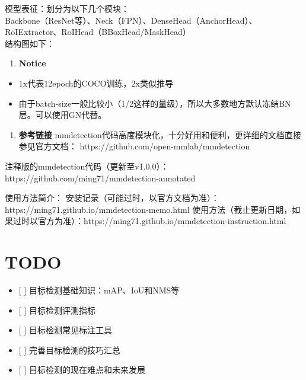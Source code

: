 模型表征：划分为以下几个模块：\\
Backbone（ResNet等）、Neck（FPN）、DenseHead（AnchorHead）、RoIExtractor、RoIHead（BBoxHead/MaskHead）\\
结构图如下： %

\begin{enumerate}
\def\labelenumi{\arabic{enumi}.}
\setcounter{enumi}{3}
\item
  \textbf{Notice}
\end{enumerate}

\begin{itemize}
\item
  1x代表12epoch的COCO训练，2x类似推导
\item
  由于batch-size一般比较小（1/2这样的量级），所以大多数地方默认冻结BN层。可以使用GN代替。
\end{itemize}

\begin{enumerate}
\def\labelenumi{\arabic{enumi}.}
\setcounter{enumi}{4}
\item
  \textbf{参考链接}
  mmdetection代码高度模块化，十分好用和便利，更详细的文档直接参见官方文档：
  https://github.com/open-mmlab/mmdetection
\end{enumerate}

注释版的mmdetection代码（更新至v1.0.0）：https://github.com/ming71/mmdetection-annotated

使用方法简介：
安装记录（可能过时，以官方文档为准）：https://ming71.github.io/mmdetection-memo.html
使用方法（截止更新日期，如果过时以官方为准）：https://ming71.github.io/mmdetection-instruction.html

\section{TODO}\label{todo}

\begin{itemize}
\item
  {[} {]} 目标检测基础知识：mAP、IoU和NMS等
\item
  {[} {]} 目标检测评测指标
\item
  {[} {]} 目标检测常见标注工具
\item
  {[} {]} 完善目标检测的技巧汇总
\item
  {[} {]} 目标检测的现在难点和未来发展
\end{itemize}


